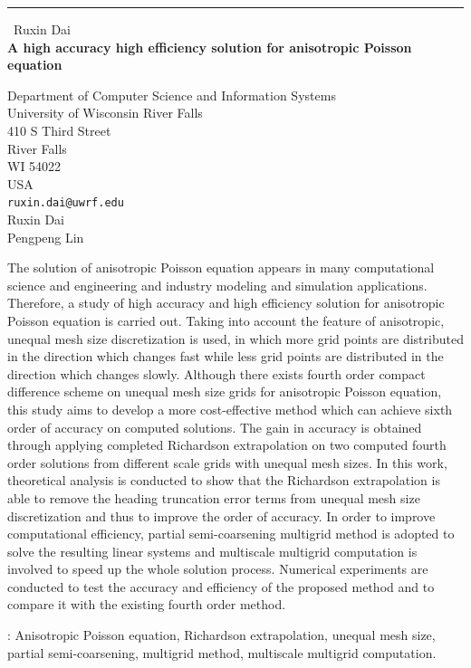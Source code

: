 \documentclass{report}
\begin{document}
\begin{center}
\rule{6in}{1pt} \
{\large Ruxin Dai \\
{\bf A high accuracy high efficiency solution for anisotropic Poisson equation}}

Department of Computer Science and Information Systems \\ University of Wisconsin River Falls \\ 410 S Third Street \\ River Falls \\ WI 54022 \\ USA
\\
{\tt ruxin.dai@uwrf.edu}\\
Ruxin Dai\\
Pengpeng Lin\end{center}

The solution of anisotropic Poisson equation appears in many
computational science and engineering and industry modeling and
simulation applications. Therefore, a study of high accuracy and high
efficiency solution for anisotropic Poisson equation is carried out.
Taking into account the feature of anisotropic, unequal mesh size
discretization is used, in which more grid points are distributed in the
direction which changes fast while less grid points are distributed in
the direction which changes slowly. Although there exists fourth order
compact difference scheme on unequal mesh size grids for anisotropic
Poisson equation, this study aims to develop a more cost-effective method
which can achieve sixth order of accuracy on computed solutions. The gain
in accuracy is obtained through applying completed Richardson
extrapolation on two computed fourth order solutions from different scale
grids with unequal mesh sizes. In this work, theoretical analysis is
conducted to show that the Richardson extrapolation is able to remove the
heading truncation error terms from unequal mesh size discretization and
thus to improve the order of accuracy. In order to improve computational
efficiency, partial semi-coarsening multigrid method is adopted to solve
the resulting linear systems and multiscale multigrid computation is
involved to speed up the whole solution process. Numerical experiments
are conducted to test the accuracy and efficiency of the proposed method
and to compare it with the existing fourth order method.

\vspace{0.1in}

: Anisotropic Poisson equation, Richardson
extrapolation, unequal mesh size, partial semi-coarsening, multigrid
method, multiscale multigrid computation.
\end{document}
